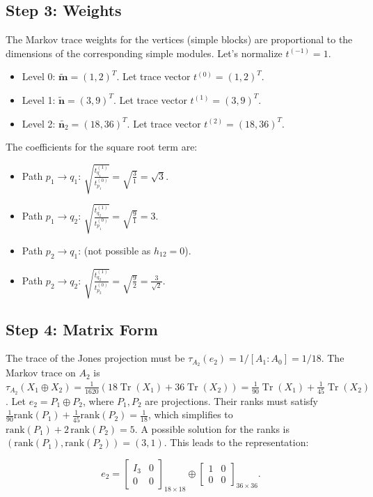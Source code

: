 \documentclass[11pt]{article}
\theoremstyle{mytheoremstyle}
\theoremstyle{definition}
\theoremstyle{remark}
\DeclareMathOperator{\Tr}{Tr}
\newcommand{\dimvec}[1]{\widetilde{\bm #1}} %
\begin{document}
\subsection*{Step 3: Weights}
The Markov trace weights for the vertices (simple blocks) are proportional to the dimensions of the corresponding simple modules. Let's normalize $t^{(-1)}=1$.
\begin{itemize}
    \item Level 0: \( \dimvec{m} = (1, 2)^T \). Let trace vector \( t^{(0)} = (1, 2)^T \).
    \item Level 1: \( \dimvec{n} = (3, 9)^T \). Let trace vector \( t^{(1)} = (3, 9)^T \).
    \item Level 2: \( \dimvec{n_2} = (18, 36)^T \). Let trace vector \( t^{(2)} = (18, 36)^T \).
\end{itemize}
The coefficients for the square root term are:
\begin{itemize}
    \item Path \( p_1 \to q_1 \): \( \sqrt{ \frac{t^{(1)}_{q_1}}{t^{(0)}_{p_1}} } = \sqrt{ \frac{3}{1} } = \sqrt{3} \).
    \item Path \( p_1 \to q_2 \): \( \sqrt{ \frac{t^{(1)}_{q_2}}{t^{(0)}_{p_1}} } = \sqrt{ \frac{9}{1} } = 3 \).
    \item Path \( p_2 \to q_1 \): (not possible as $h_{12}=0$).
    \item Path \( p_2 \to q_2 \): \( \sqrt{ \frac{t^{(1)}_{q_2}}{t^{(0)}_{p_2}} } = \sqrt{ \frac{9}{2} } = \frac{3}{\sqrt{2}} \).
\end{itemize}
\medskip

\subsection*{Step 4: Matrix Form}
The trace of the Jones projection must be \( \tau_{A_2}(e_2) = 1/[A_1:A_0] = 1/18 \). The Markov trace on $A_2$ is \( \tau_{A_2}(X_1 \oplus X_2) = \frac{1}{1620}(18\Tr(X_1) + 36\Tr(X_2)) = \frac{1}{90}\Tr(X_1) + \frac{1}{45}\Tr(X_2) \). Let \( e_2 = P_1 \oplus P_2 \), where $P_1, P_2$ are projections. Their ranks must satisfy \( \frac{1}{90}\mathrm{rank}(P_1) + \frac{1}{45}\mathrm{rank}(P_2) = \frac{1}{18} \), which simplifies to \( \mathrm{rank}(P_1) + 2\,\mathrm{rank}(P_2) = 5 \).
A possible solution for the ranks is \( (\mathrm{rank}(P_1), \mathrm{rank}(P_2)) = (3, 1) \). This leads to the representation:

\[
e_{2} = \begin{bmatrix} I_3 & 0 \\
0 & 0 \end{bmatrix}_{18 \times 18} \oplus \begin{bmatrix} 1 & 0 \\
0 & 0 \end{bmatrix}_{36 \times 36}.
\]
\end{document}
